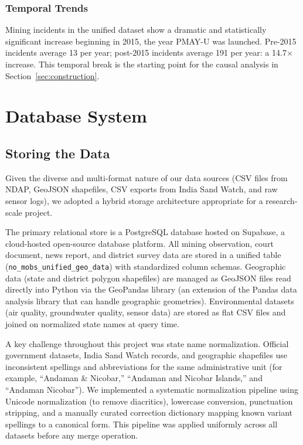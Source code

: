 \documentclass[12pt]{article}
\begin{document}
\subsubsection{Temporal Trends}

Mining incidents in the unified dataset show a dramatic and statistically significant increase beginning in 2015, the year PMAY-U was launched. Pre-2015 incidents average 13 per year; post-2015 incidents average 191 per year: a 14.7$\times$ increase. This temporal break is the starting point for the causal analysis in Section~\ref{sec:construction}.

\section{Database System}

\subsection{Storing the Data}

Given the diverse and multi-format nature of our data sources (CSV files from NDAP, GeoJSON shapefiles, CSV exports from India Sand Watch, and raw sensor logs), we adopted a hybrid storage architecture appropriate for a research-scale project.

The primary relational store is a PostgreSQL database hosted on Supabase, a cloud-hosted open-source database platform. All mining observation, court document, news report, and district survey data are stored in a unified table (\texttt{no\_mobs\_unified\_geo\_data}) with standardized column schemas. Geographic data (state and district polygon shapefiles) are managed as GeoJSON files read directly into Python via the GeoPandas library (an extension of the Pandas data analysis library that can handle geographic geometries). Environmental datasets (air quality, groundwater quality, sensor data) are stored as flat CSV files and joined on normalized state names at query time.

A key challenge throughout this project was state name normalization. Official government datasets, India Sand Watch records, and geographic shapefiles use inconsistent spellings and abbreviations for the same administrative unit (for example, ``Andaman \& Nicobar,'' ``Andaman and Nicobar Islands,'' and ``Andaman Nicobar''). We implemented a systematic normalization pipeline using Unicode normalization (to remove diacritics), lowercase conversion, punctuation stripping, and a manually curated correction dictionary mapping known variant spellings to a canonical form. This pipeline was applied uniformly across all datasets before any merge operation.
\end{document}
